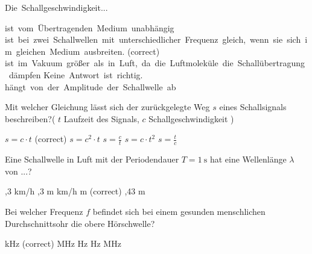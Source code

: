 \documentclass[11pt]{exam}
\begin{document}
\setlength{\voffset}{-0.5in}
\setlength{\headsep}{5pt}

\hspace{2mm}
 \hspace{5mm}
\vspace{4mm}

\begin{questions}

\question Die Schallgeschwindigkeit...

\begin{choices}
	\choice ist vom Übertragenden Medium unabhängig
	\choice ist bei zwei Schallwellen mit unterschiedlicher Frequenz gleich, wenn sie sich im gleichen Medium ausbreiten. (correct)
	\choice ist im Vakuum größer als in Luft, da die Luftmoleküle die Schallübertragung dämpfen
	\choice Keine Antwort ist richtig.
	\choice hängt von der Amplitude der Schallwelle ab
\end{choices}

\vspace{3mm}\question Mit welcher Gleichung lässt sich der zurückgelegte Weg \( s \) eines Schallsignals beschreiben?( \( t \) Laufzeit des Signals, \( c \) Schallgeschwindigkeit )

\begin{choices}
	\choice \( s=c \cdot t \) (correct)
	\choice \( s=c^2 \cdot t \)
	\choice \( s= \frac{c}{t} \)
	\choice \( s = c \cdot t^2 \)
	\choice \( s= \frac{t}{c} \)
\end{choices}

\vspace{3mm}\question Eine Schallwelle in Luft mit der Periodendauer \( T= \mathrm{1~s} \) hat eine Wellenlänge \( \lambda \) von ...?

\begin{choices}
	,3 km/h
	,3 m
	 km/h
	 m (correct)
	,43 m
\end{choices}

\vspace{3mm}\question Bei welcher Frequenz \( f \) befindet sich bei einem gesunden menschlichen Durchschnittsohr die obere Hörschwelle?

\begin{choices}
	 kHz (correct)
	 MHz
	 Hz
	 Hz
	 MHz
\end{choices}


\end{questions}
\end{document}
